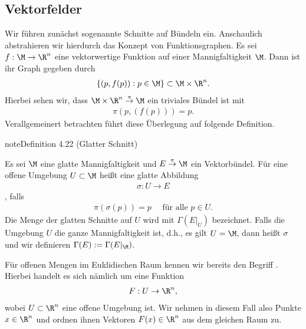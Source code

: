 \documentclass[letterpaper,10pt,german]{jupyterBook}
\begin{document}
\subsection{Vektorfelder}
\label{\detokenize{manifolds/tangential:vektorfelder}}
\sphinxAtStartPar
Wir führen zunächst sogenannte Schnitte auf Bündeln ein.
Anschaulich abstrahieren wir hierdurch das Konzept von Funktionsgraphen.
Es sei \(f:\M\to\R^n\) eine vektorwertige Funktion auf einer Mannigfaltigkeit \(\M\).
Dann ist ihr Graph gegeben durch
\begin{equation*}
\begin{split}\{(p,f(p)): p\in\M\}\subset \M\times\R^n.\end{split}
\end{equation*}
\sphinxAtStartPar
Hierbei sehen wir, dass \(\M\times\R^n\overset{\pi}{\to}\M\) ein triviales Bündel ist mit
\begin{equation*}
\begin{split}\pi(p,(f(p))) = p.\end{split}
\end{equation*}
\sphinxAtStartPar
Verallgemeinert betrachten führt diese Überlegung auf folgende Definition.
\label{manifolds/tangential:definition-29}
\begin{sphinxadmonition}{note}{Definition 4.22 (Glatter Schnitt)}



\sphinxAtStartPar
Es sei \(\M\) eine glatte Mannigfaltigkeit und \(E\overset{\pi}{\to}\M\) ein Vektorbündel.
Für eine offene Umgebung \(U\subset\M\) heißt eine glatte Abbildung
\begin{equation*}
\begin{split}\sigma: U\to E\end{split}
\end{equation*}
\sphinxAtStartPar
{}, falls
\begin{equation*}
\begin{split}\pi(\sigma(p)) = p\quad\text{ für alle }p\in U.\end{split}
\end{equation*}
\sphinxAtStartPar
Die Menge der glatten Schnitte auf \(U\) wird mit \(\Gamma(E\rvert_U)\) bezeichnet.
Falls die Umgebung \(U\) die ganze Mannigfaltigkeit ist, d.h., es gilt \(U=\M\), dann heißt \(\sigma\)  und wir definieren \(\Gamma(E):=\Gamma(E\rvert_\M)\).
\end{sphinxadmonition}

\sphinxAtStartPar
Für offenen Mengen im Euklidischen Raum kennen wir bereits den Begriff .
Hierbei handelt es sich nämlich um eine Funktion
\begin{equation*}
\begin{split}F:U\to\R^n,\end{split}
\end{equation*}
\sphinxAtStartPar
wobei \(U\subset\R^n\) eine offene Umgebung ist.
Wir nehmen in diesem Fall also Punkte \(x\in\R^n\) und ordnen ihnen Vektoren \(F(x)\in\R^n\) aus dem gleichen Raum zu.
\end{document}
